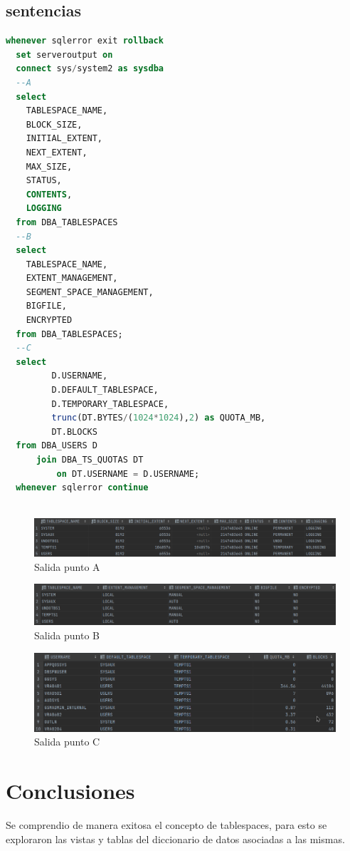 \documentclass[journal]{IEEEtran}
\begin{document}
\subsection{sentencias}
\begin{lstlisting}[language=sql, caption=s-00-consulta-tablespaces.sql,label={lst:codigo1}]
  whenever sqlerror exit rollback
  set serveroutput on
  connect sys/system2 as sysdba
  --A
  select
    TABLESPACE_NAME,
    BLOCK_SIZE,
    INITIAL_EXTENT,
    NEXT_EXTENT,
    MAX_SIZE,
    STATUS,
    CONTENTS,
    LOGGING
  from DBA_TABLESPACES
  --B
  select
    TABLESPACE_NAME,
    EXTENT_MANAGEMENT,
    SEGMENT_SPACE_MANAGEMENT,
    BIGFILE,
    ENCRYPTED
  from DBA_TABLESPACES;
  --C
  select
         D.USERNAME,
         D.DEFAULT_TABLESPACE,
         D.TEMPORARY_TABLESPACE,
         trunc(DT.BYTES/(1024*1024),2) as QUOTA_MB,
         DT.BLOCKS
  from DBA_USERS D
      join DBA_TS_QUOTAS DT
          on DT.USERNAME = D.USERNAME;
  whenever sqlerror continue
  
\end{lstlisting}
\begin{figure}[H]
  \centering
  \includegraphics[scale=.22]{captura_1.png}
   \caption{Salida punto A}
   \label{fig:validador_1}
\end{figure}
\begin{figure}[H]
  \centering
  \includegraphics[scale=.22]{captura_2.png}
   \caption{Salida punto B}
   \label{fig:validador_2}
\end{figure}
\begin{figure}[H]
  \centering
  \includegraphics[scale=.22]{captura_3.png}
   \caption{Salida punto C}
   \label{fig:validador_3}
\end{figure}

\section{Conclusiones}
Se comprendio de manera exitosa el concepto de tablespaces, para esto se exploraron las vistas y 
tablas del diccionario de datos asociadas a las mismas.
\ifCLASSOPTIONcaptionsoff
  \newpage

\fi
\end{document}
